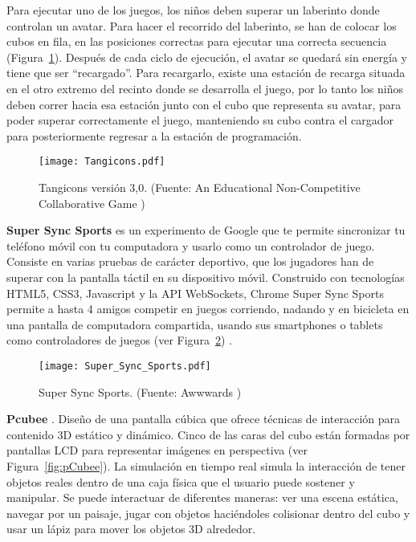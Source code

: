 Para ejecutar uno de los juegos, los niños deben superar un laberinto donde controlan un avatar. Para hacer el recorrido del laberinto, se han de colocar los cubos en fila, en las posiciones correctas para ejecutar una correcta secuencia (Figura~\ref{fig:Tangicons}). Después de cada ciclo de ejecución, el avatar se quedará sin energía y tiene que ser “recargado”. Para recargarlo, existe una estación de recarga situada en el otro extremo del recinto donde se desarrolla el juego, por lo tanto los niños deben correr hacia esa estación junto con el cubo que representa su avatar, para poder superar correctamente el juego, manteniendo su cubo contra el cargador para posteriormente regresar a la estación de programación.

\begin{figure}[!h]
\begin{center}
\texttt{[image: Tangicons.pdf]}
\caption{Tangicons versión 3,0. (Fuente: An Educational Non-Competitive Collaborative Game \cite{Tangicons})}
\label{fig:Tangicons}
\end{center}
\end{figure}



\textbf{Super Sync Sports} \cite{Awwwards} es un experimento de Google que te permite sincronizar tu teléfono móvil con tu computadora y usarlo como un controlador de juego. Consiste en varias pruebas de carácter deportivo, que los jugadores han de superar con la pantalla táctil en su dispositivo móvil. Construido con tecnologías HTML5, CSS3, Javascript y la API WebSockets, Chrome Super Sync Sports permite a hasta 4 amigos competir en juegos corriendo, nadando y en bicicleta en una pantalla de computadora compartida, usando sus smartphones o tablets como controladores de juegos (ver Figura~\ref{fig:Awwwards}) .

\begin{figure}[!h]
\begin{center}
\texttt{[image: Super\_Sync\_Sports.pdf]}
\caption{Super Sync Sports. (Fuente: Awwwards \cite{Awwwards})}
\label{fig:Awwwards}
\end{center}
\end{figure}


\textbf{Pcubee} \cite{pCubee}. Diseño de una pantalla cúbica que ofrece técnicas de interacción para contenido 3D estático y dinámico. Cinco de las caras del cubo están formadas por pantallas LCD para representar imágenes en perspectiva (ver Figura~\ref{fig:pCubee}). La simulación en tiempo real simula la interacción de tener objetos reales dentro de una caja física que el usuario puede sostener y manipular. Se puede interactuar de diferentes maneras: ver una escena estática, navegar por un paisaje, jugar con objetos haciéndoles colisionar dentro del cubo y usar un lápiz para mover los objetos 3D alrededor.

